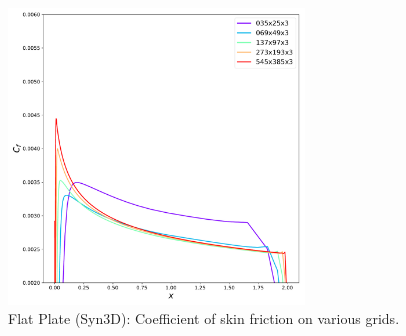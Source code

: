 \begin{figure}[ht!]
\centering
  \includegraphics[width=0.7\textwidth]{figs/flat/skin_friction_grid.pdf}
  \caption{Flat Plate (Syn3D): Coefficient of skin friction on various grids.}
  \label{fig:synflatcfstudy}
\end{figure}

